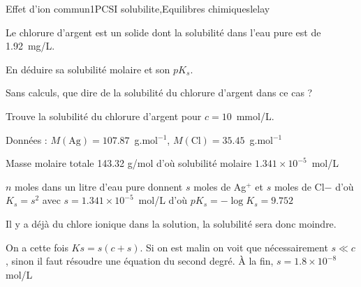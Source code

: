 \begin{exercise}{Effet d'ion commun}{1}{PCSI}
{solubilite,Equilibres chimiques}{lelay}

Le chlorure d'argent est un solide dont la solubilité dans l'eau pure est de 1.92~mg/L.

\begin{questions}

    \question En déduire sa solubilité molaire et son $pK_s$.
    

    \question Sans calculs, que dire de la solubilité du chlorure d'argent dans ce cas ?

    \question Trouve la solubilité du chlorure d'argent pour $c = 10$~mmol/L.
    
\end{questions}
Données : $M(\text{Ag}) = 107.87$~g.mol$^{-1}$, $M(\text{Cl}) = 35.45$~g.mol$^{-1}$
\end{exercise}

\begin{solution}
\begin{questions}

    \question Masse molaire totale 143.32 g/mol d'où solubilité molaire $1.341\times 10^{-5}$~mol/L
    
    $n$ moles dans un litre d'eau pure donnent $s$ moles de Ag$^{+}$ et $s$ moles de Cl${-}$ d'où $K_s = s^2$ avec $s = 1.341\times 10^{-5}$~mol/L d'où $pK_s = -\log K_s = 9.752$
    
    \question Il y a déjà du chlore ionique dans la solution, la solubilité sera donc moindre.
    
    \question On a cette fois $Ks = s (c + s)$. Si on est malin on voit que nécessairement $s \ll c$, sinon il faut résoudre une équation du second degré. À la fin, $s = 1.8\times 10^{-8}$ mol/L
    
\end{questions}
\end{solution}

